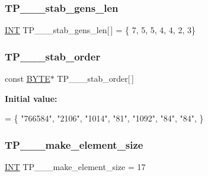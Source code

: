 \subsubsection{\texorpdfstring{T\+P\+\_\+\_\+\_\+stab\+\_\+gens\+\_\+len}{TP\_3\_3\_stab\_gens\_len}}
{\footnotesize\ttfamily \mbox{\hyperlink{galois_8h_a09fddde158a3a20bd2dcadb609de11dc}{I\+NT}} T\+P\+\_\+\_\+\_\+stab\+\_\+gens\+\_\+len\mbox{[}$\,$\mbox{]} = \{ 7, 5, 5, 4, 4, 2, 3\}}

\mbox{\label{data___t_p_8_c_aab42de0b63d72abfad2366b16dd3ee8c}} 
\subsubsection{\texorpdfstring{T\+P\+\_\+\_\+\_\+stab\+\_\+order}{TP\_3\_3\_stab\_order}}
{\footnotesize\ttfamily const \mbox{\hyperlink{galois_8h_ab6cc7b4aeb6ea31aba2b3fbfc83ff5e6}{B\+Y\+TE}}$\ast$ T\+P\+\_\+\_\+\_\+stab\+\_\+order\mbox{[}$\,$\mbox{]}}

{\bfseries Initial value\+:}
\begin{DoxyCode}
= \{
\textcolor{stringliteral}{"766584"},
\textcolor{stringliteral}{"2106"},
\textcolor{stringliteral}{"1014"},
\textcolor{stringliteral}{"81"},
\textcolor{stringliteral}{"1092"},
\textcolor{stringliteral}{"84"},
\textcolor{stringliteral}{"84"},
\}
\end{DoxyCode}
\mbox{\label{data___t_p_8_c_aad364fe981e0086307dd12c201591ac5}} 
\subsubsection{\texorpdfstring{T\+P\+\_\+\_\+\_\+make\+\_\+element\+\_\+size}{TP\_4\_2\_make\_element\_size}}
{\footnotesize\ttfamily \mbox{\hyperlink{galois_8h_a09fddde158a3a20bd2dcadb609de11dc}{I\+NT}} T\+P\+\_\+\_\+\_\+make\+\_\+element\+\_\+size = 17}

